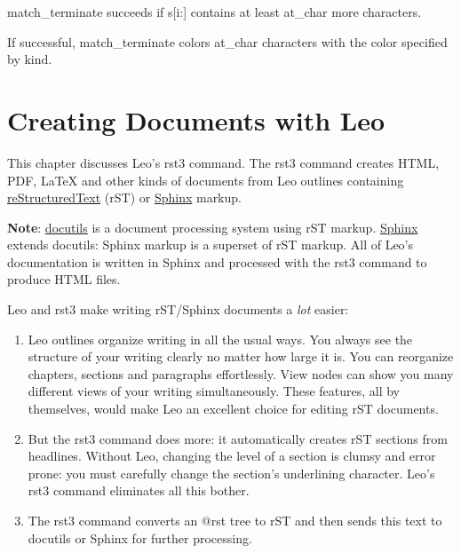 \documentclass[a4paper,10pt,english]{sphinxmanual}
\begin{document}
match\_terminate succeeds if s{[}i:{]} contains at least at\_char more characters.

If successful, match\_terminate colors at\_char characters
with the color specified by kind.


\chapter{Creating Documents with Leo}
\label{rstplugin3::doc}\label{rstplugin3:creating-documents-with-leo}
This chapter discusses Leo's rst3 command. The rst3 command creates HTML, PDF,
LaTeX and other kinds of documents from Leo outlines containing
\href{http://docutils.sourceforge.net/rst.html}{reStructuredText} (rST) or \href{http://sphinx.pocoo.org/}{Sphinx} markup.

\textbf{Note}: \href{http://docutils.sourceforge.net}{docutils} is a document processing system using rST markup.
\href{http://sphinx.pocoo.org/}{Sphinx} extends docutils: Sphinx markup is a superset of rST markup. All of
Leo's documentation is written in Sphinx and processed with the rst3 command to
produce HTML files.

Leo and rst3 make writing rST/Sphinx documents a \emph{lot} easier:
\begin{enumerate}
\item {} 
Leo outlines organize writing in all the usual ways. You always see the
structure of your writing clearly no matter how large it is. You can
reorganize chapters, sections and paragraphs effortlessly. View nodes can
show you many different views of your writing simultaneously. These
features, all by themselves, would make Leo an excellent choice for
editing rST documents.

\item {} 
But the rst3 command does more: it automatically creates rST sections from
headlines. Without Leo, changing the level of a section is clumsy and error
prone: you must carefully change the section's underlining character. Leo's
rst3 command eliminates all this bother.

\item {} 
The rst3 command converts an @rst tree to rST and then sends this text to
docutils or Sphinx for further processing.

\end{enumerate}
\end{document}
